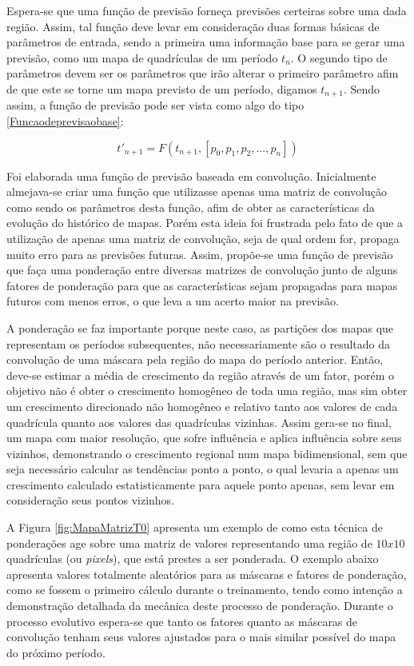 Espera-se que uma função de previsão forneça previsões certeiras sobre uma dada região. Assim, tal função deve levar em consideração duas formas básicas de parâmetros de entrada, sendo a primeira uma informação base para se gerar uma previsão, como um mapa de quadrículas de um período \(t_n\). O segundo tipo de parâmetros devem ser os parâmetros que irão alterar o primeiro parâmetro afim de que este se torne um mapa previsto de um período, digamos \(t_{n+1}\). Sendo assim, a função de previsão pode ser vista como algo do tipo \ref{Funcaodeprevisaobase}:

\begin{equation}
\label{Funcaodeprevisaobase}
t'_{n+1} = F(t_{n+1}, [p_0,p_1,p_2,...,p_n])
\end{equation}

Foi elaborada uma função de previsão baseada em convolução. Inicialmente almejava-se criar uma função que utilizasse apenas uma matriz de convolução como sendo os parâmetros desta função, afim de obter as características da evolução do histórico de mapas. Porém esta ideia foi frustrada pelo fato de que a utilização de apenas uma matriz de convolução, seja de qual ordem for, propaga muito erro para as previsões futuras. Assim, propõe-se uma função de previsão que faça uma ponderação entre diversas matrizes de convolução junto de alguns fatores de ponderação para que as características sejam propagadas para mapas futuros com menos erros, o que leva a um acerto maior na previsão. 

A ponderação se faz importante porque neste caso, as partições dos mapas que representam os períodos subsequentes, não necessariamente são o resultado da convolução de uma máscara pela região do mapa do período anterior. Então, deve-se estimar a média de crescimento da região através de um fator, porém o objetivo não é obter o crescimento homogêneo de toda uma região, mas sim obter um crescimento direcionado não homogêneo e relativo tanto aos valores de cada quadrícula quanto aos valores das quadrículas vizinhas. Assim gera-se no final, um mapa com maior resolução, que sofre influência e aplica influência sobre seus vizinhos, demonstrando o crescimento regional num mapa bidimensional, sem que seja necessário calcular as tendências ponto a ponto, o qual levaria a apenas um crescimento calculado estatisticamente para aquele ponto apenas, sem levar em consideração seus pontos vizinhos.

A Figura \ref{fig:MapaMatrizT0} apresenta um exemplo de como esta técnica de ponderações age sobre uma matriz de valores representando uma região de \(10x10\) quadrículas (ou \emph{pixels}), que está prestes a ser ponderada. O exemplo abaixo apresenta valores totalmente aleatórios para as máscaras e fatores de ponderação, como se fossem o primeiro cálculo durante o treinamento, tendo como intenção a demonstração detalhada da mecânica deste processo de ponderação. Durante o processo evolutivo espera-se que tanto os fatores quanto as máscaras de convolução tenham seus valores ajustados para o mais similar possível do mapa do próximo período. 

